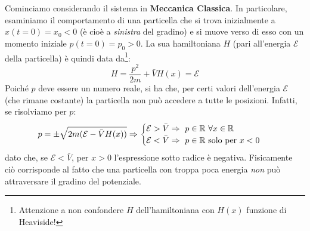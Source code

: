 \documentclass[../../FisicaTeorica.tex]{subfiles}
\begin{document}
Cominciamo considerando il sistema in \textbf{Meccanica Classica}. In particolare, esaminiamo il comportamento di una particella che si trova inizialmente a $x(t=0) = x_0 < 0$ (è cioè a \textit{sinistra} del gradino) e si muove verso di esso con un momento iniziale $p(t=0)=p_0 > 0$. La sua hamiltoniana $H$ (pari all'energia $\mathcal{E}$ della particella) è quindi data da\footnote{Attenzione a non confondere $H$ dell'hamiltoniana con $H(x)$ funzione di Heaviside!}:
\[
H=\frac{p^2}{2m}+\bar{V}H(x)=\mathcal{E}
\]
Poiché $p$ deve essere un numero reale, si ha che, per certi valori dell'energia $\mathcal{E}$ (che rimane costante) la particella non può accedere a tutte le posizioni. Infatti, se risolviamo per $p$:
\[
p=\pm \sqrt{2m(\mathcal{E}-\bar{V}H(x))}\Rightarrow \begin{cases}
\mathcal{E}>\bar{V} \Rightarrow \text{ $p\in\mathbb{R}$ $\forall x \in \mathbb{R}$}\\
\mathcal{E}<\bar{V} \Rightarrow \text{ $p\in\mathbb{R}$ solo per $x < 0$ }
\end{cases}
\]
dato che, se $\mathcal{E}<\bar{V}$, per $x>0$ l'espressione sotto radice è negativa. Fisicamente ciò corrisponde al fatto che una particella con troppa poca energia \textit{non} può attraversare il gradino del potenziale.\\
\end{document}
